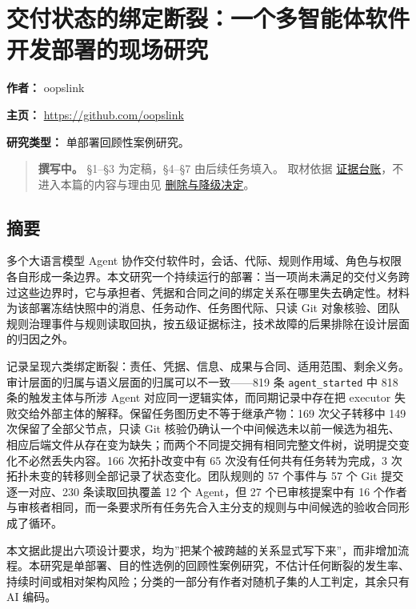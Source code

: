 \documentclass[
]{article}
\author{}
\date{}
\begin{document}
\section{交付状态的绑定断裂：一个多智能体软件开发部署的现场研究}\label{ux4ea4ux4ed8ux72b6ux6001ux7684ux7ed1ux5b9aux65adux88c2ux4e00ux4e2aux591aux667aux80fdux4f53ux8f6fux4ef6ux5f00ux53d1ux90e8ux7f72ux7684ux73b0ux573aux7814ux7a76}

\textbf{作者：} oopslink

\textbf{主页：} \url{https://github.com/oopslink}

\textbf{研究类型：} 单部署回顾性案例研究。

\begin{quote}
\textbf{撰写中。} §1--§3 为定稿，§4--§7 由后续任务填入。 取材依据
\href{evidence-ledger.md}{证据台账}，不进入本篇的内容与理由见
\href{exclusions.md}{删除与降级决定}。
\end{quote}

\subsection{摘要}\label{ux6458ux8981}

多个大语言模型 Agent
协作交付软件时，会话、代际、规则作用域、角色与权限各自形成一条边界。本文研究一个持续运行的部署：当一项尚未满足的交付义务跨过这些边界时，它与承担者、凭据和合同之间的绑定关系在哪里失去确定性。材料为该部署冻结快照中的消息、任务动作、任务图代际、只读
Git
对象核验、团队规则治理事件与规则读取回执，按五级证据标注，技术故障的后果排除在设计层面的归因之外。

记录呈现六类绑定断裂：责任、凭据、信息、成果与合同、适用范围、剩余义务。审计层面的归属与语义层面的归属可以不一致------819
条 \texttt{agent\_started} 中 818 条的触发主体与所涉 Agent
对应同一逻辑实体，而同期记录中存在把 executor
失败交给外部主体的解释。保留任务图历史不等于继承产物：169 次父子转移中
149 次保留了全部父节点，只读 Git
核验仍确认一个中间候选未以前一候选为祖先、相应后端文件从存在变为缺失；而两个不同提交拥有相同完整文件树，说明提交变化不必然丢失内容。166
次拓扑改变中有 65 次没有任何共有任务转为完成，3
次拓扑未变的转移则全部记录了状态变化。团队规则的 57 个事件与 57 个 Git
提交逐一对应、230 条读取回执覆盖 12 个 Agent，但 27 个已审核提案中有 16
个作者与审核者相同，而一条要求所有任务先合入主分支的规则与中间候选的验收合同形成了循环。

本文据此提出六项设计要求，均为''把某个被跨越的关系显式写下来''，而非增加流程。本研究是单部署、目的性选例的回顾性案例研究，不估计任何断裂的发生率、持续时间或相对架构风险；分类的一部分有作者对随机子集的人工判定，其余只有
AI 编码。
\end{document}
